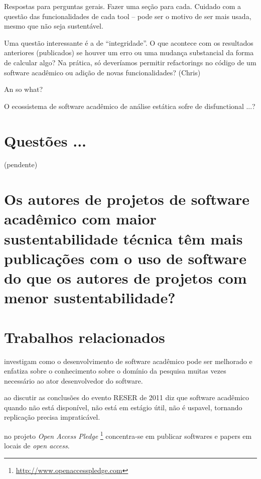\label{discussao}

Respostas para perguntas gerais. Fazer uma seção para cada.
Cuidado com a questão das funcionalidades de cada tool -- pode ser o motivo de ser mais usada,
mesmo que não seja sustentável.

Uma questão interessante é a de ``integridade''. 
O que acontece com os resultados anteriores (publicados)
se houver um erro ou uma mudança substancial da forma de calcular algo?
Na prática, só deveríamos permitir refactorings no código 
de um software acadêmico ou adição de novas funcionalidades?
(Chris)

An so what?

O ecossistema de software acadêmico de análise estática sofre de disfunctional ...?


\section{Questões ...} 

(pendente)

\section{Os autores de projetos de software acadêmico com maior sustentabilidade técnica têm mais publicações com o uso de software do que os autores de projetos com menor sustentabilidade?}

\section{Trabalhos relacionados}

 investigam como o desenvolvimento de software
acadêmico pode ser melhorado e enfatiza sobre o conhecimento sobre o domínio da
pesquisa muitas vezes necessário ao ator desenvolvedor do software.

 ao discutir as conclusões do evento RESER de
2011 diz que software acadêmico quando não está disponível, não está em estágio
útil, não é uspavel, tornando replicação precisa impraticável.

 no projeto {\it Open Access Pledge}
\footnote{\url{http://www.openaccesspledge.com}} concentra-se em publicar
softwares e papers em locais de {\it open access}.

